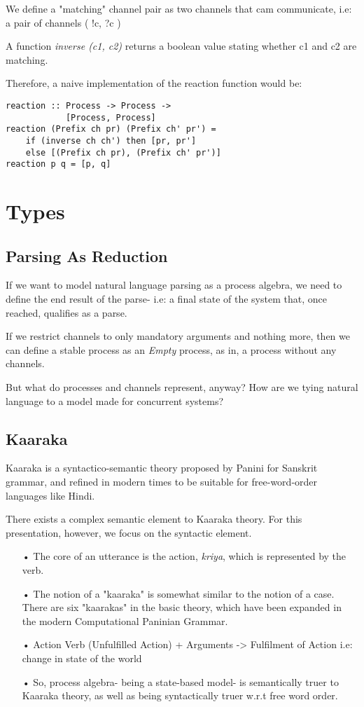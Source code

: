 \documentclass{article}
\begin{document}
We define a "matching" channel pair as two channels that cam communicate, i.e: a pair of channels ( !c, ?c )

A function \textit{inverse (c1, c2)} returns a boolean value stating whether c1 and c2 are matching. 

Therefore, a naive implementation of the reaction function would be:

\begin{lstlisting}
reaction :: Process -> Process -> 
            [Process, Process]
reaction (Prefix ch pr) (Prefix ch' pr') = 
	if (inverse ch ch') then [pr, pr'] 
	else [(Prefix ch pr), (Prefix ch' pr')] 
reaction p q = [p, q]
\end{lstlisting}

\section{Types}

\subsection{Parsing As Reduction}

If we want to model natural language parsing as a process algebra, we need to define the end result of the parse- i.e: a final state of the system that, once reached, qualifies as a parse.

If we restrict channels to only mandatory arguments and nothing more, then we can define a stable process as an \textit{Empty} process, as in, a process without any channels.

But what do processes and channels represent, anyway? How are we tying natural language to a model made for concurrent systems?


\subsection{Kaaraka}

Kaaraka is a syntactico-semantic theory proposed by Panini for Sanskrit grammar, and refined in modern times to be suitable for free-word-order languages like Hindi.

There exists a complex semantic element to Kaaraka theory. For this presentation, however, we focus on the syntactic element.

\begin{itemize}
\item[•]
The core of an utterance is the action, \textit{kriya}, which is represented by the verb.
\item[•]
The notion of a "kaaraka" is somewhat similar to the notion of a case. There are six "kaarakas" in the basic theory, which have been expanded in the modern Computational Paninian Grammar.
\item[•]
Action Verb (Unfulfilled Action) + Arguments -> Fulfilment of Action i.e: change in state of the world
\item[•]
So, process algebra- being a state-based model- is semantically truer to Kaaraka theory, as well as being syntactically truer w.r.t free word order.
\end{itemize}
\end{document}
